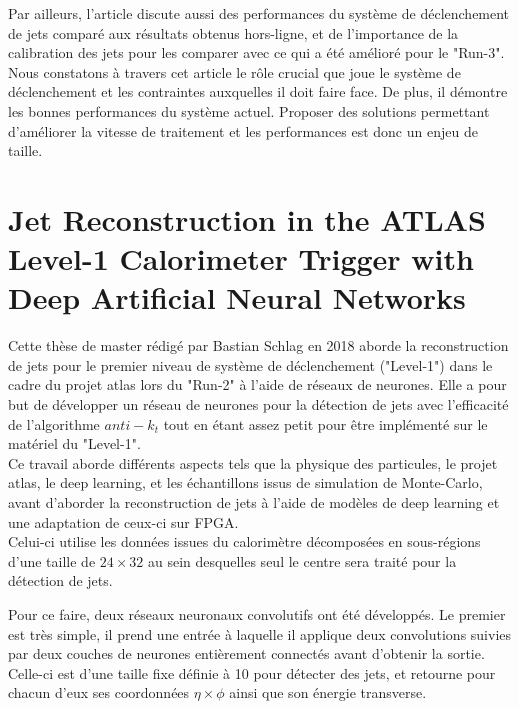 Par ailleurs, l'article discute aussi des performances du système de déclenchement de jets comparé aux résultats obtenus hors-ligne, et de l'importance de la calibration des jets pour les comparer avec ce qui a été amélioré pour le "Run-3".\\

Nous constatons à travers cet article le rôle crucial que joue le système de déclenchement et les contraintes auxquelles il doit faire face. De plus, il démontre les bonnes performances du système actuel. Proposer des solutions permettant d'améliorer la vitesse de traitement et les performances est donc un enjeu de taille.

\section{Jet Reconstruction in the ATLAS Level-1 Calorimeter Trigger with Deep Artificial Neural Networks \cite{schlag_jet_2018}}

Cette thèse de master rédigé par Bastian Schlag en 2018 aborde la reconstruction de jets pour le premier niveau de système de déclenchement ("Level-1") dans le cadre du projet \acrshort{atlas} lors du "Run-2" à l'aide de réseaux de neurones. Elle a pour but de développer un réseau de neurones pour la détection de jets avec l'efficacité de l'algorithme $anti-k_t$ tout en étant assez petit pour être implémenté sur le matériel du "Level-1".\\

Ce travail aborde différents aspects tels que la physique des particules, le projet \acrshort{atlas}, le deep learning, et les échantillons issus de simulation de Monte-Carlo, avant d'aborder la reconstruction de jets à l'aide de modèles de deep learning et une adaptation de ceux-ci sur FPGA.\\

Celui-ci utilise les données issues du calorimètre décomposées en sous-régions d'une taille de $24 \times 32$ au sein desquelles seul le centre sera traité pour la détection de jets.

Pour ce faire, deux réseaux neuronaux convolutifs ont été développés. Le premier est très simple, il prend une entrée à laquelle il applique deux convolutions suivies par deux couches de neurones entièrement connectés avant d'obtenir la sortie. Celle-ci est d'une taille fixe définie à 10 pour détecter des jets, et retourne pour chacun d'eux ses coordonnées $\eta \times \phi$ ainsi que son énergie transverse.

